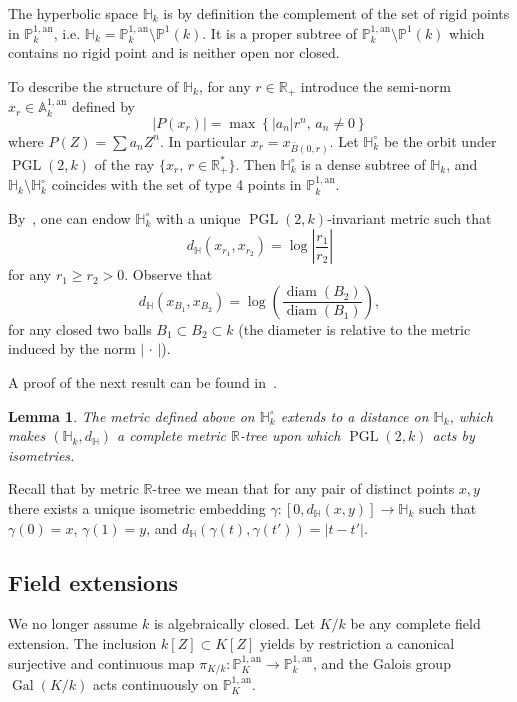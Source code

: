 \documentclass[10pt]{amsart}
\newtheorem{lemm}[theo]{Lemma}\newtheorem{prop}[theo]{Proposition}\newtheorem{coro}[theo]{Corollary}\newtheorem{conj}[theo]{Conjecture}
\theoremstyle{definition}\newtheorem{defi}[theo]{Definition}\newtheorem{rema}[theo]{Remark}\newtheorem{exam}[theo]{Example}\newtheorem{exem}[theo]{Example}\newtheorem{nota}[theo]{Notation}
\DeclareMathOperator{\Gal}{Gal}
\DeclareMathOperator{\diam}{diam}
\DeclareMathOperator{\PGL}{PGL}
\newcommand{\hh}{\mathbb{H}}
\newcommand{\A}{{\mathbb A}}
\newcommand{\R}{{\mathbb R}}
\newcommand{\an}{\mathrm{an}}
\newcommand{\PP}{\mathbb{P}}
\newcommand{\PGLk}{\PGL(2, k)}
\begin{document}
The hyperbolic space $\hh_k$ is by definition the complement of the set of rigid points in $\PP^{1,\an}_k$, i.e. $\hh_k = \PP^{1,\an}_k \setminus \PP^{1}(k)$. It is a proper subtree of $\PP^{1,\an}_k \setminus \PP^1(k)$ which contains no rigid point and is neither open nor closed.

To describe the structure of $\hh_k$, for any $r\in \R_+$ introduce the semi-norm $x_r\in \A^{1,\an}_k$ defined by
\[
|P(x_r)| = \max \left\{ |a_n| r^n, \, a_n \neq 0 \right\}
\]
where $P(Z) = \sum a_n Z^n$. In particular $x_r = x_{\bar B(0,r)}$. Let $\hh_k^\circ$ be the orbit under $\PGL(2,k)$ of the ray $\{ x_r, \, r\in \R_+^*\}$. Then $\hh_k^\circ$ is a dense subtree of $\hh_k$, and $\hh_k \setminus \hh_k^\circ$ coincides with the set of type 4 points in $\PP^{1,\an}_k$.

By~\cite[Prop.~2.30]{baker-rumely}, one can endow $\hh_k^\circ$ with a unique $\PGL(2,k)$-invariant metric such that
\[
d_{\hh} (x_{r_1}, x_{r_2}) = \log \left|\frac{r_1}{r_2}\right|
\]
for any $r_1\ge r_2 >0$. Observe that
\[
d_{\hh} (x_{B_1}, x_{B_2}) = \log \left(\frac{\diam(B_2)}{\diam(B_1)}\right),
\]
for any closed two balls $B_1 \subset B_2 \subset k$ (the diameter is relative to the metric induced by the norm $|{\,\cdot\,}|$).

A proof of the next result can be found in~\cite[Prop.~2.29]{baker-rumely}.

\begin{lemm}
The metric defined above on $\hh_k^\circ$ extends to a distance on $\hh_k$, which makes $(\hh_k, d_{\hh})$ a complete metric $\R$-tree upon which $\PGLk$ acts by isometries.
\end{lemm}

Recall that by metric $\R$-tree we mean that for any pair of distinct points $x,y$ there exists a unique isometric embedding $\gamma : [0,d_{\hh}(x,y)] \to \hh_k$ such that $\gamma(0) = x$, $\gamma(1) =y$, and $d_{\hh}(\gamma(t), \gamma(t')) = |t -t'|$.

\subsection{Field extensions}\label{subs:field extensions}

We no longer assume $k$ is algebraically closed. Let $K/k$ be any complete field extension. The inclusion $k[Z] \subset K[Z]$ yields by restriction a canonical surjective and continuous map $\pi_{K/k}\colon \PP^{1,\an}_K \to \PP^{1,\an}_k$, and the Galois group $\Gal(K/k)$ acts continuously on $\PP^{1,\an}_K$.
\end{document}
